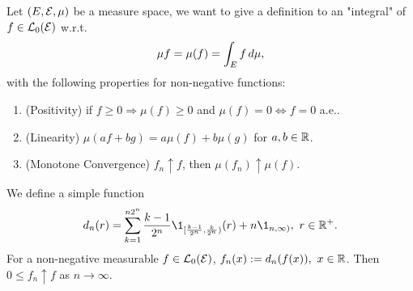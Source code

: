 \np Let $(E,\mathcal{E},\mu)$ be a measure space, we want to give a definition to an "integral" of $f \in \mathcal{L}_0(\mathcal{E})$ w.r.t.
\begin{equation*}
    \mu f = \mu(f) = \int_E f \,d\mu,
\end{equation*}
with the following properties for non-negative functions:
\begin{enumerate}[label = (\alph*)]
    \item (Positivity) if $f \geq 0 \Rightarrow \mu(f) \geq 0$ and $\mu(f) = 0 \Leftrightarrow f = 0$ a.e..
    \item (Linearity) $\mu(a f + bg) = a \mu(f) + b \mu(g)$ for $a,b \in \mathbb{R}$.
    \item (Monotone Convergence) $f_n \uparrow f$, then $\mu(f_n) \uparrow \mu(f)$.
\end{enumerate}
We define a simple function
\begin{equation*}
    d_n(r) = \sum_{k=1}^{n 2^n} \frac{k-1}{2^n} \1_{[\frac{k-1}{2^n},\frac{k}{2^n})} (r) + n \1_{n,\infty)},\ r \in \R^+.
\end{equation*}
For a non-negative measurable $f \in \mathcal{L}_0(\mathcal{E})$, $f_n(x) := d_n(f(x)),\ x \in \mathbb{R}$. Then $0 \leq f_n \uparrow f$ as $n \to \infty$.


